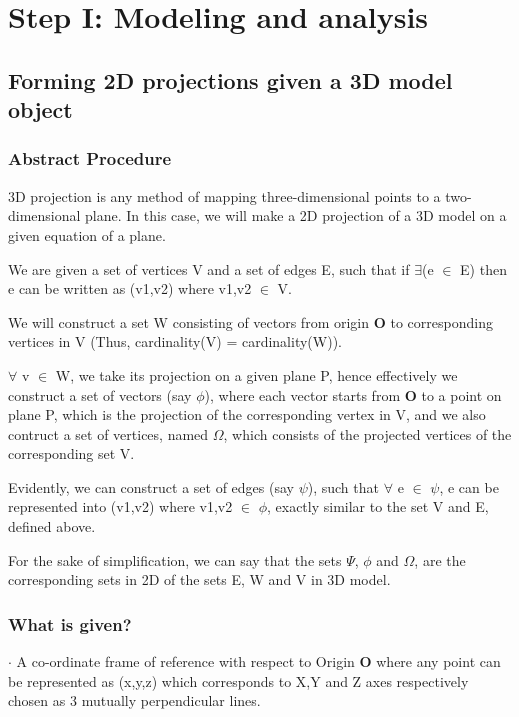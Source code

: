 \documentclass[12pt]{article}
\begin{document}

\tableofcontents
\pagebreak

\section{Step I: Modeling and analysis}
\subsection{Forming 2D projections given a 3D model object}
\subsubsection{Abstract Procedure}

3D projection is any method of mapping three-dimensional points to a two-dimensional plane. In this case, we will make a 2D projection of a 3D model on a given equation of a plane.

We are given a set of vertices V and a set of edges E, such that if $\exists$(e $\in$ E) then e can be written as (v1,v2) where v1,v2 $\in$ V. 

We will construct a set W consisting of vectors from origin \textbf{O} to corresponding vertices in V (Thus, cardinality(V) = cardinality(W)).

$\forall$ v $\in$ W, we take its projection on a given plane P, hence effectively we construct a set of vectors (say $\phi$), where each vector starts from \textbf{O} to a point on plane P, which is the projection of the corresponding vertex in V, and we also contruct a set of vertices, named $\Omega$, which consists of the projected vertices of the corresponding set V.

Evidently, we can construct a set of edges (say $\psi$), such that $\forall $ e $\in$ $\psi$, e can be represented into (v1,v2) where v1,v2 $\in$ $\phi$, exactly similar to the set V and E, defined above.

For the sake of simplification, we can say that the sets $\Psi$, $\phi$ and $\Omega$, are the corresponding sets in 2D of the sets E, W and V in 3D model.

\subsubsection{What is given?}
$\cdot$ A co-ordinate frame of reference with respect to Origin \textbf{O} where any point can be represented as (x,y,z) which corresponds to X,Y and Z axes respectively chosen as 3 mutually perpendicular lines.
\end{document}
